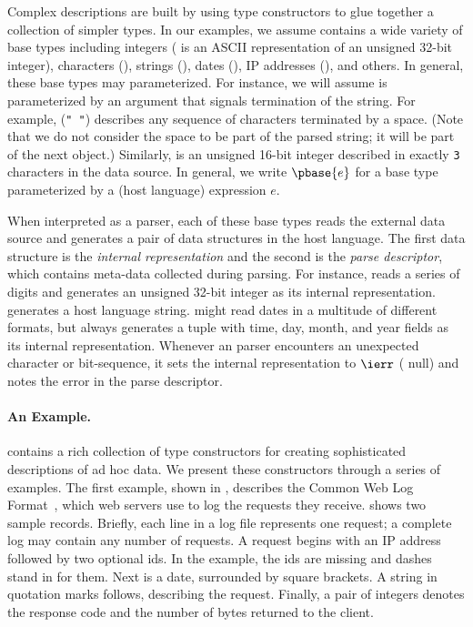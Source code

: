 Complex \ipads{} descriptions are built by using type constructors to glue together a collection of simpler types. In our examples, we
assume \ipads{} contains a wide variety of base types including
integers (\Puint{} is an ASCII representation of an unsigned
32-bit integer), characters (\Pchar), strings (\Pstring), dates
(\Pdate), IP addresses (\Pip), and others.  In general, these base
types may parameterized.  For instance, we will assume \Pstring{} is
parameterized by an argument that signals termination of the
string.  For example, \Pstring({\tt " "}) describes any sequence of
characters terminated by a space. 
(Note that we do not consider the space to be part of the parsed string; 
it will be part of the next object.)
Similarly,  is an unsigned 16-bit
integer described in exactly {\tt 3} characters in the data source.
In general, we write $\pbase{e}$ for a base type parameterized by a
(host language) expression $e$.

When interpreted as a parser, each of these base types reads
the external data source and generates a pair of data structures
in the host language.  The first data structure is the
{\em internal representation}  and
the second is the {\em parse descriptor}, which contains meta-data collected during parsing.
For instance, \Puint{} reads a series of digits and generates an unsigned 32-bit integer as its
internal representation.  \Pstring{} generates a 
host language string.  
\Pdate{} might read dates in a multitude of
different formats, but always generates a tuple
with time, day, month, and year fields as its internal 
representation.  Whenever an \ipads{} parser encounters
an unexpected character or bit-sequence, it sets the internal representation to
$\ierr$ (\ie{} null) and notes the error in the
parse descriptor.

\paragraph*{An \ipads{} Example.}
\ipads{} contains a rich collection of type constructors for creating
sophisticated descriptions of ad hoc data.  We present these
constructors through a series of examples.  The first example, shown
in , describes the Common Web
Log Format~\cite{wpp}, which web servers use to log the requests they
receive.   shows two sample
records.  Briefly, each line in a log file represents one request;
a complete log may contain any number of requests.  A request begins
with an IP address followed by two optional ids.  In the
example, the ids are missing and dashes stand in for them.  Next is a date,
surrounded by square brackets.  A string in
quotation marks follows, describing the request.  Finally,
a pair of integers denotes the response code and the
number of bytes returned to the client.

